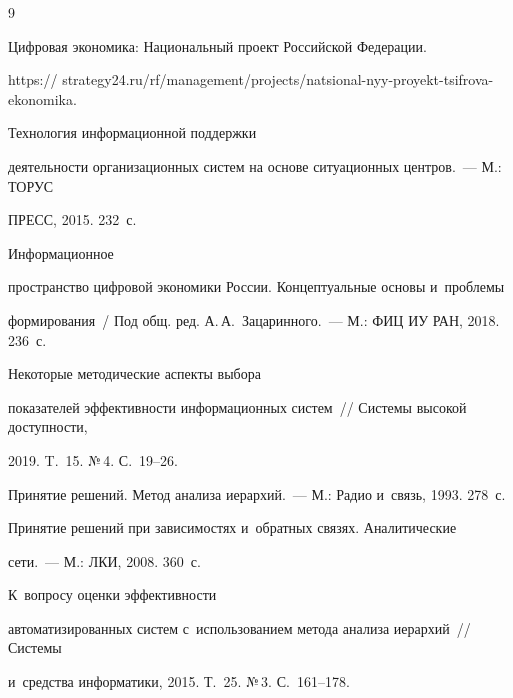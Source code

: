 {\small\frenchspacing

{%


\begin{thebibliography}{9}




  Цифровая экономика: Национальный проект Российской Федерации.  

{\sf https:// strategy24.ru/rf/management/projects/natsional-nyy-proyekt-tsifrova-ekonomika}.


   Технология информационной поддержки 

деятельности организационных систем на основе ситуационных центров.~--- М.: ТОРУС 

ПРЕСС, 2015. 232~с.


   Информационное 

пространство цифровой экономики России. Концептуальные основы и~проблемы 

формирования~/ Под общ. ред. А.\,А.~Зацаринного.~--- М.: ФИЦ ИУ РАН, 2018. 236~с. 


   Некоторые методические аспекты выбора 

показателей эффективности информационных систем~/\!\!/ Системы высокой доступности, 

2019. T.~15. №\,4. С.~19--26.


   Принятие решений. Метод анализа иерархий.~--- М.: Радио и~связь, 1993. 278~с.


   Принятие решений при зависимостях и~обратных связях. Аналитические 

сети.~--- М.: ЛКИ, 2008. 360~с.


   К~вопросу оценки эффективности 

автоматизированных систем с~использованием метода анализа иерархий~/\!\!/ Системы 

и~средства информатики, 2015. Т.~25. №\,3. С.~161--178.

 \end{thebibliography}

} }



